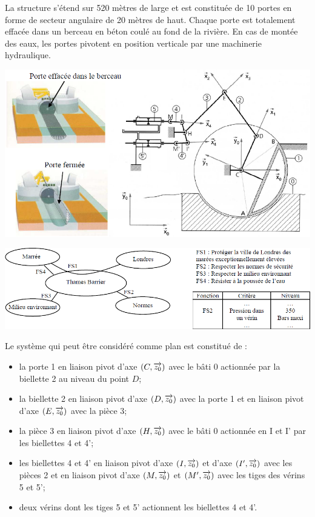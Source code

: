 \documentclass[11pt,oneside]{article}
\begin{document}
La structure s'étend sur 520 mètres de large et est constituée de 10 portes en forme de secteur angulaire de 20 mètres de haut. Chaque porte est totalement effacée dans un berceau en béton coulé au fond de la rivière. En cas de montée des eaux, les portes pivotent en position verticale par une machinerie hydraulique. 

\begin{center}
\includegraphics[width=.9\textwidth]{png/img4.png}
\end{center}

\begin{center}
\includegraphics[width=.9\textwidth]{png/img5.png}
\end{center}

Le système qui peut être considéré comme plan est constitué de : 
\begin{itemize}
\item la porte 1 en liaison pivot d'axe $(C,\overrightarrow{z_0})$ avec le bâti 0 actionnée par la biellette 2 au niveau du point $D$;
\item la biellette 2 en liaison pivot d'axe $(D,\overrightarrow{z_0})$ avec la porte 1 et en liaison pivot d'axe $(E,\overrightarrow{z_0})$ avec la pièce 3;
\item la pièce 3 en liaison pivot d'axe $(H,\overrightarrow{z_0})$ avec le bâti 0 actionnée en I et I' par les biellettes 4 et 4';
\item les biellettes 4 et 4' en liaison pivot d'axe $(I,\overrightarrow{z_0})$ et d'axe $(I',\overrightarrow{z_0})$ avec les pièces 2 et en liaison pivot d'axe $(M,\overrightarrow{z_0})$ et $(M',\overrightarrow{z_0})$ avec les tiges des vérins 5 et 5';
\item deux vérins dont les tiges 5 et 5' actionnent les biellettes 4 et 4'. 
\end{itemize}
\end{document}
